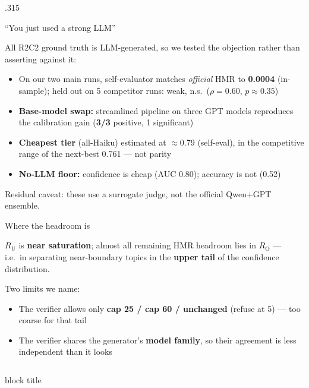 \documentclass[final]{beamer}
\newcommand{\HMR}{\textsc{HMR}}
\newcommand{\RO}{R_{\mathrm{O}}}
\newcommand{\RU}{R_{\mathrm{U}}}
\begin{document}
\begin{frame}[t]
\begin{columns}[t]
\begin{column}{.315\paperwidth}
\begin{block}{``You just used a strong LLM''}
{\large
All R2C2 ground truth is LLM-generated, so we tested the objection rather than
asserting against it:
\begin{itemize}
  \item On our two main runs, self-evaluator matches \emph{official} \HMR{} to \textbf{0.0004} (in-sample);
        held out on 5 competitor runs: weak, n.s.\ ($\rho{=}0.60$, $p{\approx}0.35$)
  \item \textbf{Base-model swap:} streamlined pipeline on three GPT models reproduces
        the calibration gain (\textbf{3/3} positive, 1 significant)
  \item \textbf{Cheapest tier} (all-Haiku) estimated at $\approx$0.79 (self-eval), in the competitive range of the
        next-best 0.761 --- not parity
  \item \textbf{No-LLM floor:} confidence is cheap (AUC 0.80); accuracy is not (0.52)
\end{itemize}
\vspace{0.3cm}
Residual caveat: these use a surrogate judge, not the official Qwen$+$GPT ensemble.
}
\end{block}

\begin{block}{Where the headroom is}
{\large
$\RU$ is \textbf{near saturation}; almost all remaining \HMR{} headroom lies in $\RO$ --- i.e.\ in separating
near-boundary topics in the \textbf{upper tail} of the confidence distribution.

\vspace{0.4cm}
Two limits we name:
\begin{itemize}
  \item The verifier allows only \textbf{cap 25 / cap 60 / unchanged} (refuse at 5) --- too coarse for that tail
  \item The verifier shares the generator's \textbf{model family}, so their agreement is
        less independent than it looks
\end{itemize}
}
\end{block}

\end{column}
\end{columns}

\vspace{1.0cm}
\begin{beamercolorbox}[wd=\paperwidth,sep=28pt]{block title}
\end{beamercolorbox}

\end{frame}
\end{document}
